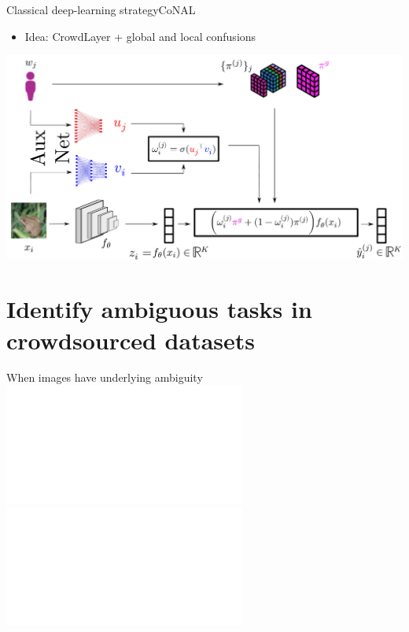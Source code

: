 \begin{frame}{Classical deep-learning strategy}{CoNAL}
    \begin{itemize}
        \item Idea: CrowdLayer + global and local confusions
    \end{itemize}
    \begin{center}
        \includegraphics[width=\textwidth]{./images/conal_scheme.pdf}
    \end{center}

\end{frame}

\section{Identify ambiguous tasks in crowdsourced datasets}

\begin{frame}[t]{When images have underlying ambiguity}{}
    \vspace{1.5cm}
        \includegraphics<1>[width=\textwidth, clip,trim={0cm 4cm 0cm 0cm}]{./images/notations_1.pdf}
     \includegraphics<2>[width=\textwidth]{./images/notations_1.pdf}
\end{frame}


